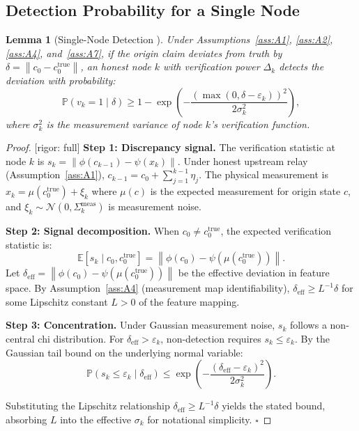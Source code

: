 \documentclass[11pt,a4paper]{article}
\newtheorem{lemma}[theorem]{Lemma}
\theoremstyle{definition}
\theoremstyle{remark}
\newcommand{\rigorFull}{\textcolor{green!60!black}{[rigor: full]}}
\newcommand{\E}{\mathbb{E}}
\newcommand{\Pbb}{\mathbb{P}}
\newcommand{\norm}[1]{\left\lVert#1\right\rVert}
\begin{document}
\subsection{Detection Probability for a Single Node}

\begin{lemma}[Single-Node Detection ]
\label{lem:single_node}
Under Assumptions~\ref{ass:A1}, \ref{ass:A2}, \ref{ass:A4}, and~\ref{ass:A7}, if the origin claim deviates from truth by $\delta = \norm{c_0 - c_0^{\text{true}}}$, an honest node $k$ with verification power $\Delta_k$ detects the deviation with probability:
\begin{equation}
    \Pbb(v_k = 1 \mid \delta) \geq 1 - \exp\left(-\frac{(\max(0, \delta - \varepsilon_k))^2}{2\sigma_k^2}\right),
    \label{eq:single_node_detection}
\end{equation}
where $\sigma_k^2$ is the measurement variance of node $k$'s verification function.
\end{lemma}

\begin{proof}\rigorFull
\textbf{Step 1: Discrepancy signal.} The verification statistic at node $k$ is $s_k = \norm{\phi(c_{k-1}) - \psi(x_k)}$. Under honest upstream relay (Assumption~\ref{ass:A1}), $c_{k-1} = c_0 + \sum_{j=1}^{k-1} \eta_j$. The physical measurement is $x_k = \mu(c_0^{\text{true}}) + \xi_k$ where $\mu(c)$ is the expected measurement for origin state $c$, and $\xi_k \sim \mathcal{N}(0, \Sigma_k^{\text{meas}})$ is measurement noise.

\textbf{Step 2: Signal decomposition.} When $c_0 \neq c_0^{\text{true}}$, the expected verification statistic is:
\begin{equation}
    \E[s_k \mid c_0, c_0^{\text{true}}] = \norm{\phi(c_0) - \psi(\mu(c_0^{\text{true}}))}.
\end{equation}
Let $\delta_{\mathrm{eff}} = \norm{\phi(c_0) - \psi(\mu(c_0^{\text{true}}))}$ be the effective deviation in feature space. By Assumption~\ref{ass:A4} (measurement map identifiability), $\delta_{\mathrm{eff}} \geq L^{-1} \delta$ for some Lipschitz constant $L > 0$ of the feature mapping.

\textbf{Step 3: Concentration.} Under Gaussian measurement noise, $s_k$ follows a non-central chi distribution. For $\delta_{\mathrm{eff}} > \varepsilon_k$, non-detection requires $s_k \leq \varepsilon_k$. By the Gaussian tail bound on the underlying normal variable:
\begin{equation}
    \Pbb(s_k \leq \varepsilon_k \mid \delta_{\mathrm{eff}}) \leq \exp\left(-\frac{(\delta_{\mathrm{eff}} - \varepsilon_k)^2}{2\sigma_k^2}\right).
\end{equation}

Substituting the Lipschitz relationship $\delta_{\mathrm{eff}} \geq L^{-1} \delta$ yields the stated bound, absorbing $L$ into the effective $\sigma_k$ for notational simplicity. \hfill $\square$
\end{proof}
\end{document}
